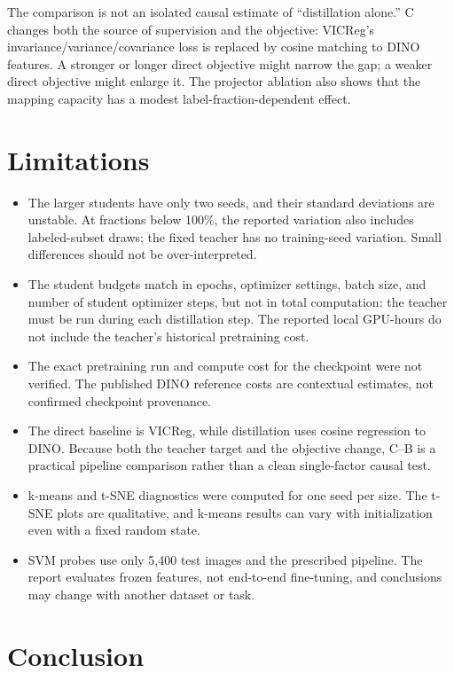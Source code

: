 \documentclass[10pt]{article}
\begin{document}
The comparison is not an isolated causal estimate of ``distillation
alone.'' C changes both the source of supervision and the objective:
VICReg's invariance/variance/covariance loss is replaced by cosine
matching to DINO features. A stronger or longer direct objective might
narrow the gap; a weaker direct objective might enlarge it. The
projector ablation also shows that the mapping capacity has a modest
label-fraction-dependent effect.

\section{Limitations}
\label{sec:limitations}

\begin{itemize}
  \item The larger students have only two seeds, and their standard
  deviations are unstable. At fractions below 100\%, the reported
  variation also includes labeled-subset draws; the fixed teacher has no
  training-seed variation. Small differences should not be over-interpreted.
  \item The student budgets match in epochs, optimizer settings, batch
  size, and number of student optimizer steps, but not in total computation:
  the teacher must be run during each distillation step. The reported local
  GPU-hours do not include the teacher's historical pretraining cost.
  \item The exact pretraining run and compute cost for the checkpoint were
  not verified. The published DINO reference costs are contextual estimates,
  not confirmed checkpoint provenance.
  \item The direct baseline is VICReg, while distillation uses cosine
  regression to DINO. Because both the teacher target and the objective
  change, C--B is a practical pipeline comparison rather than a clean
  single-factor causal test.
  \item k-means and t-SNE diagnostics were computed for one seed per size.
  The t-SNE plots are qualitative, and k-means results can vary with
  initialization even with a fixed random state.
  \item SVM probes use only 5,400 test images and the prescribed pipeline.
  The report evaluates frozen features, not end-to-end fine-tuning, and
  conclusions may change with another dataset or task.
\end{itemize}

\section{Conclusion}
\end{document}
